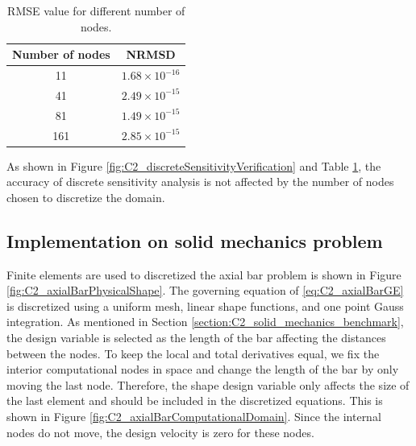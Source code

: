 \begin{table}[H]
\centering
\begin{tabular}{| c | c |}
    \hline
    Number of nodes & NRMSD \\ \hline \hline
    11 & $1.68 \times 10^{-16}$ \\ \hline
    41 & $2.49 \times 10^{-15}$ \\ \hline
    81 & $1.49 \times 10^{-15}$ \\ \hline
    161 & $2.85 \times 10^{-15}$ \\ \hline
\end{tabular}
\caption{RMSE value for different number of nodes.}
\label{table:C2_DSA_NRMSD}
\end{table}

As shown in Figure \ref{fig:C2_discreteSensitivityVerification} and Table \ref{table:C2_DSA_NRMSD}, the accuracy of discrete sensitivity analysis is not affected by the number of nodes chosen to discretize the domain.

\subsection{Implementation on solid mechanics problem}
Finite elements are used to discretized the axial bar problem is shown in Figure \ref{fig:C2_axialBarPhysicalShape}. The governing equation of \eqref{eq:C2_axialBarGE} is discretized using a uniform mesh, linear shape functions, and one point Gauss integration. As mentioned in Section \ref{section:C2_solid_mechanics_benchmark}, the design variable is selected as the length of the bar affecting the distances between the nodes. To keep the local and total derivatives equal, we fix the interior computational nodes in space and change the length of the bar by only moving the last node. Therefore, the shape design variable only affects the size of the last element and should be included in the discretized equations. This is shown in Figure \ref{fig:C2_axialBarComputationalDomain}. Since the internal nodes do not move, the design velocity is zero for these nodes.

